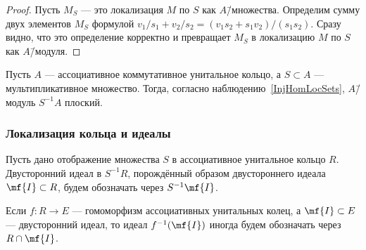 \documentclass[
	extrafontsizes,
	11pt,
	hyphens,
]{memoir}
\begin{document}
\begin{proof}%
Пусть \(M_S\) --- это локализация \(M\) по \(S\) как \(A\)\=/множества.
Определим сумму двух элементов \(M_S\) формулой \(v_1/s_1 + v_2/s_2 = (v_1 s_2 + s_1 v_2)/(s_1 s_2)\).
Сразу видно, что это определение корректно и превращает \(M_S\) в локализацию \(M\) по \(S\) как \(A\)\=/модуля.
\end{proof}




\begin{observation}
Пусть \(A\) --- ассоциативное коммутативное унитальное кольцо, а \(S \subset A\) --- мультипликативное множество.
Тогда, согласно наблюдению~\ref{InjHomLocSets}, \(A\)\=/модуль \(S^{-1}A\) плоский.
\end{observation}

\subsubsection{Локализация кольца и идеалы}

\begin{notation}
Пусть дано отображение множества \(S\) в ассоциативное унитальное кольцо \(R\).
Двусторонний идеал в \(S^{-1}R\), порождённый образом двустороннего идеала \(\mf{I} \subset R\), будем обозначать через \(S^{-1}\mf{I}\).
\end{notation}

\begin{notation}
Если \(f : R \to E\) --- гомоморфизм ассоциативных унитальных колец, а \(\mf{I} \subset E\) --- двусторонний идеал, то идеал \(f^{-1}(\mf{I})\) иногда будем обозначать через \(R \cap \mf{I}\).
\end{notation}
\end{document}
